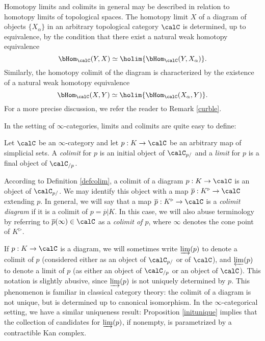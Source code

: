 \begin{remark}
Homotopy limits and colimits in general may be described in
relation to homotopy limits of topological spaces. The homotopy
limit $X$ of a diagram of objects $\{X_{\alpha} \}$ in an
arbitrary topological category $\calC$ is determined, up to
equivalence, by the condition that there exist a natural weak homotopy
equivalence
$$\bHom_{\calC}(Y,X) \simeq \holim \{ \bHom_{\calC}(Y, X_{\alpha})
\}.$$ Similarly, the homotopy colimit of the diagram is characterized by
the existence of a natural weak homotopy equivalence
$$\bHom_{\calC}(X,Y) \simeq \holim \{ \bHom_{\calC}(X_{\alpha},Y)
\}.$$
For a more precise discussion, we refer the reader to Remark \ref{curble}.
\end{remark}

In the setting of $\infty$-categories, limits and colimits
are quite easy to define:

\begin{definition}\label{defcolim}
Let $\calC$ be an $\infty$-category and let $p: K \rightarrow \calC$ be an
arbitrary map of simplicial sets. A {\it colimit} for $p$ is
an initial object of $\calC_{p/}$ and a {\it limit} for $p$ is a final
object of $\calC_{/p}$.
\end{definition}

\begin{remark}
According to Definition \ref{defcolim}, a colimit of a diagram $p: K \rightarrow \calC$
is an object of $\calC_{p/}$. We may identify this object with a map
$\overline{p}: K^{\triangleright} \rightarrow \calC$ extending $p$. In general, we will say that a map $\overline{p}: K^{\triangleright} \rightarrow \calC$ is a {\it colimit diagram} if it is a colimit
of $p = \overline{p} | K$. In this case, we will also abuse terminology by referring to
$\overline{p}(\infty) \in \calC$ as a {\it colimit of $p$}, where $\infty$ denotes the cone point of
$K^{\triangleright}$.
\end{remark}

If $p: K \rightarrow \calC$ is a diagram, we will sometimes
write $\varinjlim(p)$ to denote a colimit of $p$ (considered either as an object of
$\calC_{p/}$ or of $\calC$), and $\varprojlim(p)$ to denote a limit of $p$ (as either an object of
$\calC_{/p}$ or an object of $\calC$). This notation is slightly abusive, since $\varinjlim(p)$ is not uniquely determined by $p$. This phenomenon is familiar in classical category theory: the colimit of a diagram is not unique, but is determined up to canonical isomorphism. In the $\infty$-categorical setting, we have a similar uniqueness result: Proposition \ref{initunique} implies that the collection of candidates for $\varinjlim(p)$, if nonempty, is parametrized by a contractible Kan complex.

